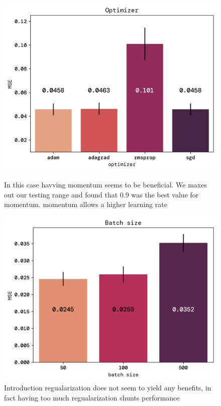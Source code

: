 \documentclass[twoside,11pt]{report}
\begin{document}
\begin{figure}[!ht]
    \begin{minipage}[t]{0.49\textwidth}
        \begin{center}
            \includegraphics[width=\textwidth]{../runsAndFigures/MSE_optimizer.png}
        \end{center}
        \caption{In this case havving momentum seems to be beneficial. We maxes out our testing range and found that 0.9 was the best value for momentum. momentum allows a higher learning rate}\label{fig:MSE_optimizer}
    \end{minipage}
    \hspace{1mm}
    \begin{minipage}[t]{0.49\textwidth}
        \begin{center}
            \includegraphics[width=\textwidth]{../runsAndFigures/MSE_batch.png}
        \end{center}
        \caption{Introduction regualarization does not seem to yield any benefits, in fact
        having too much regualarization shunts performance}\label{fig:MSE_batch}
    \end{minipage}
\end{figure}
\end{document}
